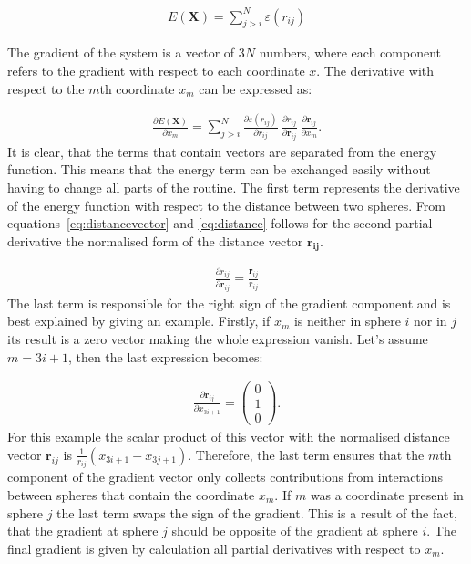 \begin{align}
    E(\mathbf{X})=\sum_{j>i}^N\varepsilon(r_{ij})
\end{align}%
%

The gradient of the system is a vector of $3N$ numbers, where each component
refers to the gradient with respect to each coordinate $x$. The derivative with
respect to the $m$th coordinate $x_m$ can be expressed as:

\begin{align}
    \frac{\partial E(\mathbf{X})}{\partial x_m}=\sum_{j>i}^N\frac{\partial\varepsilon(r_{ij})}{\partial r_{ij}}\ \frac{\partial r_{ij}}{\partial\mathbf{r}_{ij}}\ \frac{\partial\mathbf{r}_{ij}}{\partial x_m}.
\end{align}%
%
It is clear, that the terms that contain vectors are separated from the energy
function. This means that the energy term can be exchanged easily without
having to change all parts of the routine. The first term represents the
derivative of the energy function with respect to the distance between two
spheres. From equations~\eqref{eq:distancevector} and \eqref{eq:distance}
follows for the second partial derivative the normalised form of the distance
vector $\mathbf{r_{ij}}$.

\begin{align}
    \frac{\partial r_{ij}}{\partial\mathbf{r}_{ij}}=\frac{\mathbf{r}_{ij}}{r_{ij}}
\end{align}%
%
The last term is responsible for the right sign of the gradient component and
is best explained by giving an example. Firstly, if $x_m$ is neither in sphere
$i$ nor in $j$ its result is a zero vector making the whole expression vanish.
Let's assume $m=3i+1$, then the last expression becomes:

\begin{align}
    \frac{\partial\mathbf{r}_{ij}}{\partial x_{3i+1}}=
    \begin{pmatrix}
        0\\1\\0
    \end{pmatrix}.
\end{align}%
%
For this example the scalar product of this vector with the normalised distance
vector $\mathbf{r}_{ij}$ is $\frac{1}{r_{ij}}(x_{3i+1} - x_{3j+1})$. Therefore,
the last term ensures that the $m$th component of the gradient vector only
collects contributions from interactions between spheres that contain the
coordinate $x_m$. If $m$ was a coordinate present in sphere $j$ the last term
swaps the sign of the gradient. This is a result of the fact, that the gradient
at sphere $j$ should be opposite of the gradient at sphere $i$. The final
gradient is given by calculation all partial derivatives with respect to $x_m$.


